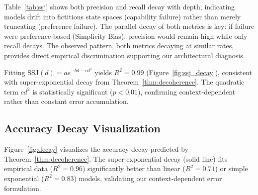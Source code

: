 \documentclass{article}
\theoremstyle{plain}
\theoremstyle{definition}
\theoremstyle{remark}
\begin{document}
\begin{table}[t]
	\caption{SSJ with precision/recall at increasing depths. Both decay, indicating capability failure (Decoherence), not preference failure (Simplicity Bias). Mean $\pm$ std over 3 runs.}
	\label{tab:ssj}
	\vskip 0.1in
	\centering
	\footnotesize
	\vskip -0.1in
\end{table}

Table~\ref{tab:ssj} shows both precision and recall decay with depth, indicating models drift into fictitious state spaces (capability failure) rather than merely truncating (preference failure). The parallel decay of both metrics is key: if failure were preference-based (Simplicity Bias), precision would remain high while only recall decays. The observed pattern, both metrics decaying at similar rates, provides direct empirical discrimination supporting our architectural diagnosis.

Fitting SSJ$(d) = ae^{-bd-cd^2}$ yields $R^2 = 0.99$ (Figure~\ref{fig:ssj_decay}), consistent with super-exponential decay from Theorem~\ref{thm:decoherence}. The quadratic term $cd^2$ is statistically significant ($p < 0.01$), confirming context-dependent rather than constant error accumulation.

\subsection{Accuracy Decay Visualization}

Figure~\ref{fig:decay} visualizes the accuracy decay predicted by Theorem~\ref{thm:decoherence}. The super-exponential decay (solid line) fits empirical data ($R^2 = 0.96$) significantly better than linear ($R^2 = 0.71$) or simple exponential ($R^2 = 0.83$) models, validating our context-dependent error formulation.
\end{document}
